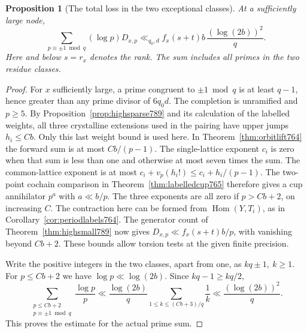 \documentclass[a4paper,11pt]{article}
\newtheorem{proposition}{Proposition}[section]
\theoremstyle{definition}
\theoremstyle{remark}
\numberwithin{equation}{section}
\begin{document}
\begin{proposition}[The total loss in the two exceptional classes]
\leavevmode\label{prop:highrare791}
At a sufficiently large node,
\[
 \sum_{p\equiv\pm1\bmod q}(\log p)D_{x,p}
       \ll_{q_0,d} f_x(s+t)b\,\frac{(\log(2b))^2}{q}.
\]
Here and below \(s=r_x\) denotes the rank. The sum includes
all primes in the two residue classes.
\end{proposition}
\begin{proof}
For \(x\) sufficiently large, a prime congruent to \(\pm1\bmod q\)
is at least \(q-1\), hence greater than any prime divisor of
\(6q_0d\). The completion is unramified and \(p\ge5\).
By Proposition~\ref{prop:highsparse789} and its calculation of
the labelled weights, all three crystalline extensions used in
the pairing have upper jumps \(h_i\le Cb\). Only this last
weight bound is used here. In Theorem~\ref{thm:orbitlift764}
the forward sum is at most \(Cb/(p-1)\). The single-lattice
exponent \(c_i\) is zero when that sum is less than one and
otherwise at most seven times the sum. The common-lattice
exponent is at most \(c_i+v_p(h_i!)\le c_i+h_i/(p-1)\).
The two-point cochain comparison in
Theorem~\ref{thm:labelledcup765} therefore gives a cup
annihilator \(p^a\) with \(a\ll b/p\). The three exponents
are all zero if \(p>Cb+2\), on increasing \(C\).
The contraction here can be formed from
\(\operatorname{Hom}(Y,T_i)\), as in
Corollary~\ref{cor:periodlabels764}. The generator count
of Theorem~\ref{thm:highsmall789} now gives
\(D_{x,p}\ll f_x(s+t)b/p\), with vanishing beyond \(Cb+2\).
These bounds allow torsion tests at the given finite precision.

Write the positive integers in the two classes, apart from
one, as \(kq\pm1,\ k\ge1\). For \(p\le Cb+2\) we have
\(\log p\ll\log(2b)\). Since \(kq-1\ge kq/2\),
\[
   \sum_{\substack{p\le Cb+2\\p\equiv\pm1\bmod q}}
       \frac{\log p}{p}
        \ll \frac{\log(2b)}q
               \sum_{1\le k\le (Cb+3)/q}\frac1k
        \ll \frac{(\log(2b))^2}q .
\]
This proves the estimate for the actual prime sum.
\end{proof}
\end{document}
